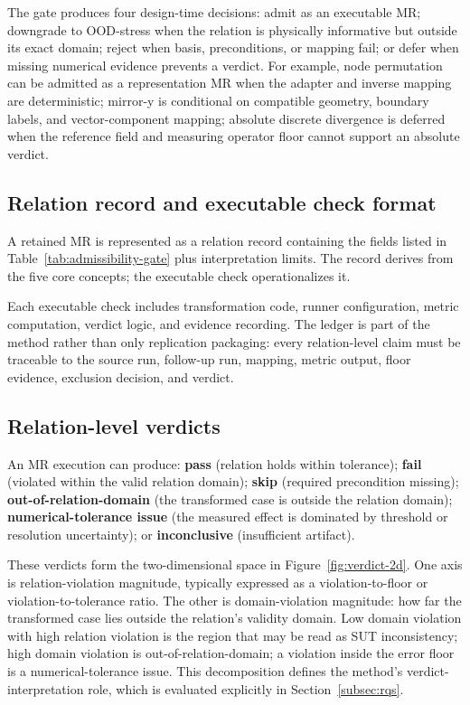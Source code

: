 \documentclass[preprint,12pt]{elsarticle}
\begin{document}
The gate produces four design-time decisions: admit as an executable MR; downgrade to OOD-stress when the relation is physically informative but outside its exact domain; reject when basis, preconditions, or mapping fail; or defer when missing numerical evidence prevents a verdict. For example, node permutation can be admitted as a representation MR when the adapter and inverse mapping are deterministic; mirror-y is conditional on compatible geometry, boundary labels, and vector-component mapping; absolute discrete divergence is deferred when the reference field and measuring operator floor cannot support an absolute verdict.

\subsection{Relation record and executable check format}
\label{subsec:relation-record}

A retained MR is represented as a relation record containing the fields listed in Table~\ref{tab:admissibility-gate} plus interpretation limits. The record derives from the five core concepts; the executable check operationalizes it.

Each executable check includes transformation code, runner configuration, metric computation, verdict logic, and evidence recording. The ledger is part of the method rather than only replication packaging: every relation-level claim must be traceable to the source run, follow-up run, mapping, metric output, floor evidence, exclusion decision, and verdict.

\subsection{Relation-level verdicts}
\label{subsec:verdicts}

An MR execution can produce: \textbf{pass} (relation holds within tolerance); \textbf{fail} (violated within the valid relation domain); \textbf{skip} (required precondition missing); \textbf{out-of-relation-domain} (the transformed case is outside the relation domain); \textbf{numerical-tolerance issue} (the measured effect is dominated by threshold or resolution uncertainty); or \textbf{inconclusive} (insufficient artifact).

These verdicts form the two-dimensional space in Figure~\ref{fig:verdict-2d}. One axis is relation-violation magnitude, typically expressed as a violation-to-floor or violation-to-tolerance ratio. The other is domain-violation magnitude: how far the transformed case lies outside the relation's validity domain. Low domain violation with high relation violation is the region that may be read as SUT inconsistency; high domain violation is out-of-relation-domain; a violation inside the error floor is a numerical-tolerance issue. This decomposition defines the method's verdict-interpretation role, which is evaluated explicitly in Section~\ref{subsec:rqs}.
\end{document}
